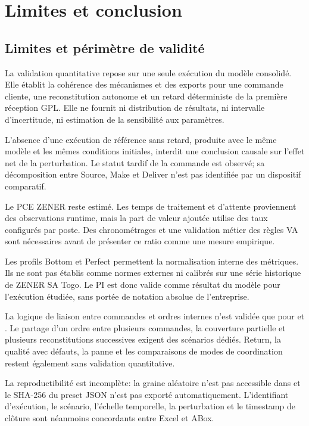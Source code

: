 \chapter{Limites et conclusion}
\label{chap:limites-conclusion}

\section{Limites et périmètre de validité}

La validation quantitative repose sur une seule exécution du modèle consolidé. Elle établit la cohérence des mécanismes et des exports pour une commande cliente, une reconstitution autonome et un retard déterministe de la première réception GPL. Elle ne fournit ni distribution de résultats, ni intervalle d'incertitude, ni estimation de la sensibilité aux paramètres.

L'absence d'une exécution de référence sans retard, produite avec le même modèle et les mêmes conditions initiales, interdit une conclusion causale sur l'effet net de la perturbation. Le statut tardif de la commande est observé; sa décomposition entre Source, Make et Deliver n'est pas identifiée par un dispositif comparatif.

Le PCE ZENER reste estimé. Les temps de traitement et d'attente proviennent des observations runtime, mais la part de valeur ajoutée utilise des taux configurés par poste. Des chronométrages et une validation métier des règles VA sont nécessaires avant de présenter ce ratio comme une mesure empirique.

Les profils Bottom et Perfect permettent la normalisation interne des métriques. Ils ne sont pas établis comme normes externes ni calibrés sur une série historique de ZENER SA Togo. Le PI est donc valide comme résultat du modèle pour l'exécution étudiée, sans portée de notation absolue de l'entreprise.

La logique de liaison entre commandes et ordres internes n'est validée que pour  et . Le partage d'un ordre entre plusieurs commandes, la couverture partielle et plusieurs reconstitutions successives exigent des scénarios dédiés. Return, la qualité avec défauts, la panne et les comparaisons de modes de coordination restent également sans validation quantitative.

La reproductibilité est incomplète: la graine aléatoire n'est pas accessible dans  et le SHA-256 du preset JSON n'est pas exporté automatiquement. L'identifiant d'exécution, le scénario, l'échelle temporelle, la perturbation et le timestamp de clôture sont néanmoins concordants entre Excel et ABox.

